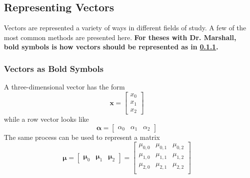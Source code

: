 \subsection{Representing Vectors}
    Vectors are represented a variety of ways in different fields of study.
    A few of the most common methods are presented here.
    \textbf{
    For theses with Dr. Marshall, bold symbols is how vectors should be represented as in \cref{sec:VectorsBoldSymbols}.
    }

\subsubsection{Vectors as Bold Symbols}\label{sec:VectorsBoldSymbols}
    A three-dimensional vector has the form
    \begin{equation}
        \bm{x}
            =\begin{bmatrix}
                x_0 \\ x_1 \\ x_2
             \end{bmatrix}
    \end{equation}
    while a row vector looks like
    \begin{equation}
        \bm{\alpha}
            =\begin{bmatrix}
                \alpha_0 & \alpha_1 & \alpha_2
             \end{bmatrix}
    \end{equation}
    The same process can be used to represent a matrix
    \begin{equation}
        \bm{\mu}
            =\begin{bmatrix}
                \bm{\mu}_0 & \bm{\mu}_1 & \bm{\mu}_{2}
             \end{bmatrix}
            =\begin{bmatrix}
                \mu_{0,0} & \mu_{0,1} & \mu_{0,2} \\
                \mu_{1,0} & \mu_{1,1} & \mu_{1,2} \\
                \mu_{2,0} & \mu_{2,1} & \mu_{2,2} \\
             \end{bmatrix}
    \end{equation}

